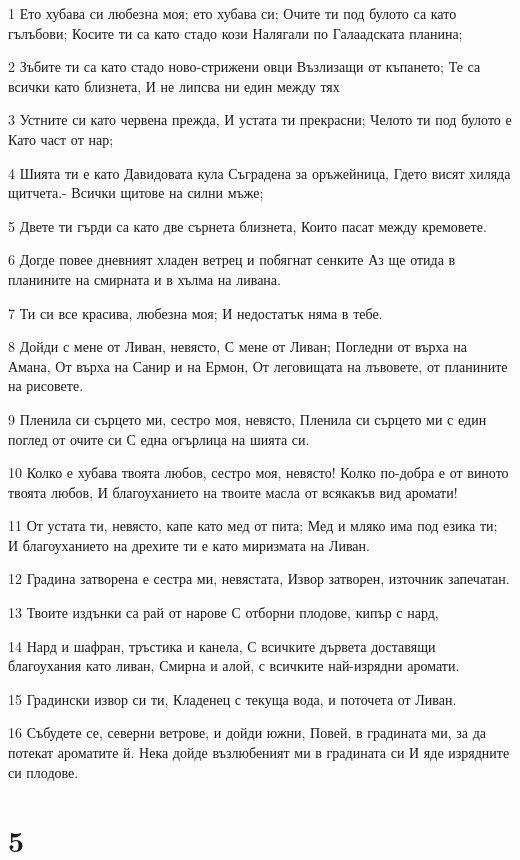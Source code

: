 \par 1 Ето хубава си любезна моя; ето хубава си; Очите ти под булото са като гълъбови; Косите ти са като стадо кози Налягали по Галаадската планина;
\par 2 Зъбите ти са като стадо ново-стрижени овци Възлизащи от къпането; Те са всички като близнета, И не липсва ни един между тях
\par 3 Устните си като червена прежда, И устата ти прекрасни; Челото ти под булото е Като част от нар;
\par 4 Шията ти е като Давидовата кула Съградена за оръжейница, Гдето висят хиляда щитчета.- Всички щитове на силни мъже;
\par 5 Двете ти гърди са като две сърнета близнета, Които пасат между кремовете.
\par 6 Догде повее дневният хладен ветрец и побягнат сенките Аз ще отида в планините на смирната и в хълма на ливана.
\par 7 Ти си все красива, любезна моя; И недостатък няма в тебе.
\par 8 Дойди с мене от Ливан, невясто, С мене от Ливан; Погледни от върха на Амана, От върха на Санир и на Ермон, От леговищата на лъвовете, от планините на рисовете.
\par 9 Пленила си сърцето ми, сестро моя, невясто, Пленила си сърцето ми с един поглед от очите си С една огърлица на шията си.
\par 10 Колко е хубава твоята любов, сестро моя, невясто! Колко по-добра е от виното твоята любов, И благоуханието на твоите масла от всякакъв вид аромати!
\par 11 От устата ти, невясто, капе като мед от пита; Мед и мляко има под езика ти; И благоуханието на дрехите ти е като миризмата на Ливан.
\par 12 Градина затворена е сестра ми, невястата, Извор затворен, източник запечатан.
\par 13 Твоите издънки са рай от нарове С отборни плодове, кипър с нард,
\par 14 Нард и шафран, тръстика и канела, С всичките дървета доставящи благоухания като ливан, Смирна и алой, с всичките най-изрядни аромати.
\par 15 Градински извор си ти, Кладенец с текуща вода, и поточета от Ливан.
\par 16 Събудете се, северни ветрове, и дойди южни, Повей, в градината ми, за да потекат ароматите й. Нека дойде възлюбеният ми в градината си И яде изрядните си плодове.

\chapter{5}

